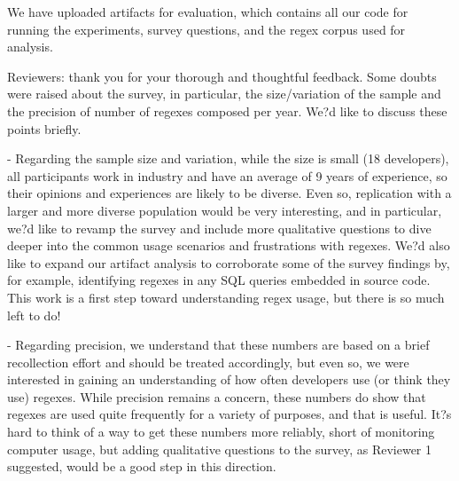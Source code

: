 We have uploaded artifacts for evaluation, which contains all our code for running the experiments, survey questions, and the regex corpus used for analysis. 

Reviewers: thank you for your thorough and thoughtful feedback. Some doubts were raised about the survey, in particular, the size/variation of the sample and the precision of number of regexes composed per year.  We?d like to discuss these points briefly. 

- Regarding the sample size and variation, while the size is small (18 developers), all participants work in industry and have an average of 9 years of experience, so their opinions and experiences are likely to be diverse. Even so, replication with a larger and more diverse population would be very interesting, and in particular, we?d like to revamp the survey and include more qualitative questions to dive deeper into the common usage scenarios and frustrations with regexes. We?d also like to expand our artifact analysis to corroborate some of the survey findings by, for example, identifying regexes in any SQL queries embedded in source code. This work is a first step toward understanding regex usage, but there is so much left to do!  

- Regarding precision, we understand that these numbers are based on a brief recollection effort and should be treated accordingly, but even so, we were interested in gaining an understanding of how often developers use (or think they use) regexes. While precision remains a concern, these numbers do show that regexes are used quite frequently for a variety of purposes, and that is useful. It?s hard to think of a way to get these numbers more reliably, short of monitoring computer usage, but adding qualitative questions to the survey, as Reviewer 1 suggested, would be a good step in this direction. 
